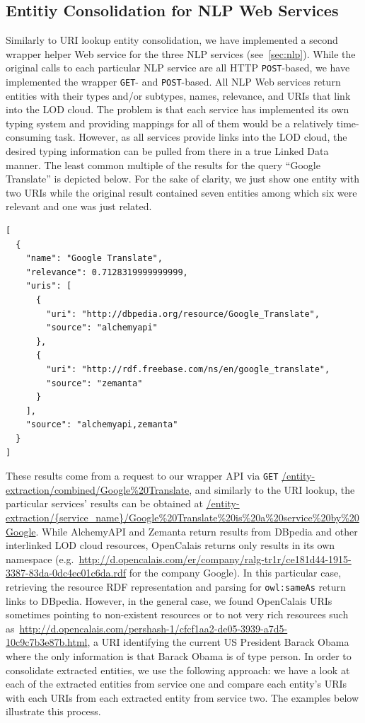 \documentclass[twocolumn]{article}
\newcommand{\nofootnote}[1]{~#1}
\begin{document}
\subsection{Entitiy Consolidation for NLP Web Services}                     \label{sec:consolidation-nlp}
Similarly to URI lookup entity consolidation, we have implemented a second wrapper helper Web service for the three NLP services (see~\ref{sec:nlp}). While the
original calls to each particular NLP service are all HTTP \texttt{POST}-based, we have implemented the wrapper
\texttt{GET}- and \texttt{POST}-based. All NLP Web services return entities with their types and/or subtypes, names,
relevance, and URIs that link into the LOD cloud. The problem is that each service has implemented its own typing
system and providing mappings for all of them would be a relatively time-consuming task. However, as all services
provide links into the LOD cloud, the desired typing information can be pulled from there in a true Linked Data manner. The least common
multiple of the results for the query ``Google Translate'' is depicted below. For the sake of clarity, we just show one
entity with two URIs while the original result contained seven entities among which six were relevant and one was just
related.
\begin{lstlisting}
[
  {
    "name": "Google Translate",
    "relevance": 0.7128319999999999,
    "uris": [
      {
        "uri": "http://dbpedia.org/resource/Google_Translate",
        "source": "alchemyapi"
      },
      {
        "uri": "http://rdf.freebase.com/ns/en/google_translate",
        "source": "zemanta"
      }
    ],
    "source": "alchemyapi,zemanta"
  }
]
\end{lstlisting}

These results come from a request to our wrapper API via \texttt{GET} \url{/entity-extraction/combined/Google%20Translate},
and similarly to the URI lookup, the particular services' results can be obtained at \url{/entity-extraction/{service_name}/Google%20Translate%20is%20a%20service%20by%20Google}.
While AlchemyAPI and Zemanta return results from DBpedia and other interlinked LOD cloud resources, OpenCalais returns
only results in its own namespace
(e.g.\nofootnote{\url{http://d.opencalais.com/er/company/ralg-tr1r/ce181d44-1915-3387-83da-0dc4ec01c6da.rdf}} for the
company Google). In this particular case, retrieving the resource RDF representation and parsing for
\texttt{owl:sameAs} return links to DBpedia. However, in the general case, we found OpenCalais URIs sometimes pointing
to non-existent resources or to not very rich resources such
as\nofootnote{\url{http://d.opencalais.com/pershash-1/cfcf1aa2-de05-3939-a7d5-10c9c7b3e87b.html}}, a URI identifying
the current US President Barack Obama where the only information is that Barack Obama is of type person. In order to
consolidate extracted entities, we use the following approach: we have a look at each of the extracted entities from
service one and compare each entity's URIs with each URIs from each extracted entity from service two. The examples
below illustrate this process.
\end{document}
